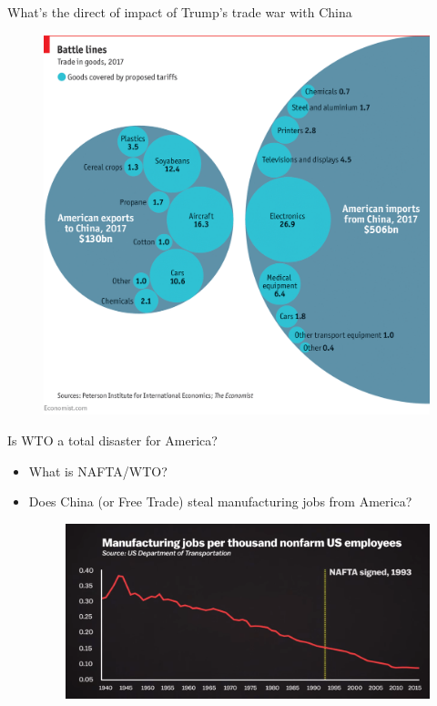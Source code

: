 \documentclass[10pt,hyperref={CJKbookmarks=true},xcolor=dvipsnames,aspectratio=169]{beamer}
\begin{document}
\begin{frame}{What's the direct of impact of Trump's trade war with China}


\begin{figure}
\includegraphics[scale=0.15]{fig//trump2.png}

\end{figure}

\end{frame}

\begin{frame}{Is WTO a total disaster for America?}

\begin{itemize}
\item What is NAFTA/WTO?
\item Does China (or Free Trade) steal manufacturing jobs from America?
\begin{figure}


\includegraphics[scale=0.2]{fig//trump3}

\end{figure}

\end{itemize}
\end{frame}
\end{document}
